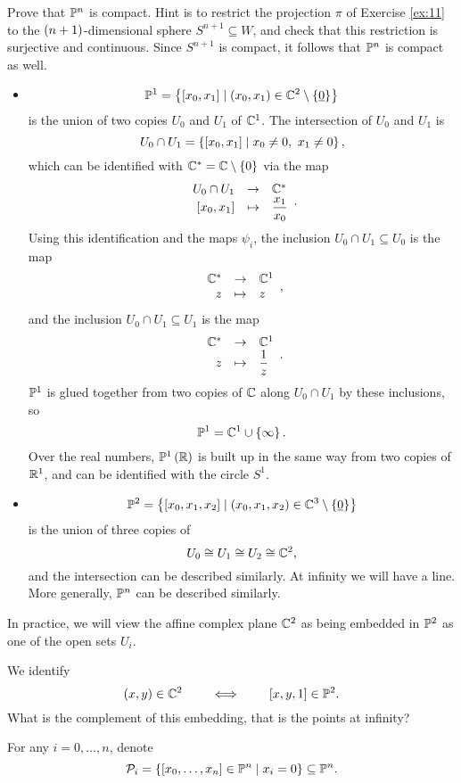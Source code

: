 \begin{exercise}
\label{ex:12}
Prove that $ \P^n $ is compact. Hint is to restrict the projection $ \pi $ of Exercise \ref{ex:11} to the $ \rb{n + 1} $-dimensional sphere $ S^{n + 1} \subseteq W $, and check that this restriction is surjective and continuous. Since $ S^{n + 1} $ is compact, it follows that $ \P^n $ is compact as well.
\end{exercise}

\begin{example}
\hfill
\begin{itemize}
\item
$$ \P^1 = \cb{\sb{x_0, x_1} \mid \rb{x_0, x_1} \in \C^2 \setminus \cb{\underline{0}}} $$
is the union of two copies $ U_0 $ and $ U_1 $ of $ \C^1 $. The intersection of $ U_0 $ and $ U_1 $ is
$$ U_0 \cap U_1 = \cb{\sb{x_0, x_1} \mid x_0 \ne 0, \ x_1 \ne 0}, $$
which can be identified with $ \C^* = \C \setminus \cb{0} $ via the map
$$ \function{U_0 \cap U_1}{\C^*}{\sb{x_0, x_1}}{\dfrac{x_1}{x_0}}. $$
Using this identification and the maps $ \psi_i $, the inclusion $ U_0 \cap U_1 \subseteq U_0 $ is the map
$$ \function{\C^*}{\C^1}{z}{z}, $$
and the inclusion $ U_0 \cap U_1 \subseteq U_1 $ is the map
$$ \function{\C^*}{\C^1}{z}{\dfrac{1}{z}}. $$
$ \P^1 $ is glued together from two copies of $ \C $ along $ U_0 \cap U_1 $ by these inclusions, so
$$ \P^1 = \C^1 \cup \cb{\infty}. $$
Over the real numbers, $ \P^1\rb{\R} $ is built up in the same way from two copies of $ \R^1 $, and can be identified with the circle $ S^1 $.
\item
$$ \P^2 = \cb{\sb{x_0, x_1, x_2} \mid \rb{x_0, x_1, x_2} \in \C^3 \setminus \cb{\underline{0}}} $$
is the union of three copies of
$$ U_0 \cong U_1 \cong U_2 \cong \C^2, $$
and the intersection can be described similarly. At infinity we will have a line. More generally, $ \P^n $ can be described similarly.
\end{itemize}
\end{example}

\pagebreak

In practice, we will view the affine complex plane $ \C^2 $ as being embedded in $ \P^2 $ as one of the open sets $ U_i $.

\begin{example*}
We identify
$$ \rb{x, y} \in \C^2 \qquad \iff \qquad \sb{x, y, 1} \in \P^2. $$
What is the complement of this embedding, that is the points at infinity?
\end{example*}

\begin{notation}
For any $ i = 0, \dots, n $, denote
$$ \PP_i = \cb{\sb{x_0, \dots, x_n} \in \P^n \mid x_i = 0} \subseteq \P^n. $$
\end{notation}

